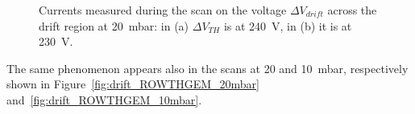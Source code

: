 \documentclass[a4paper, 11 pt]{report}
\newcommand{\Vthgem}{$\Delta V_{TH}$}
\newcommand{\Vdrift}{$ \Delta V_{drift}$}
\begin{document}
\begin{figure}[!htb]
	\centering
	\caption{Currents measured during the scan on the voltage \Vdrift{} across the drift region at 
	20~mbar: in (a) \Vthgem{} is at 240~V, in (b) it is at 230~V.}
	\label{fig:drift_ROWTHGEM_30mbar_both}
\end{figure}
The same phenomenon appears also in the scans at 20 and 10~mbar, respectively shown in 
Figure~\ref{fig:drift_ROWTHGEM_20mbar} and~\ref{fig:drift_ROWTHGEM_10mbar}.
\end{document}
